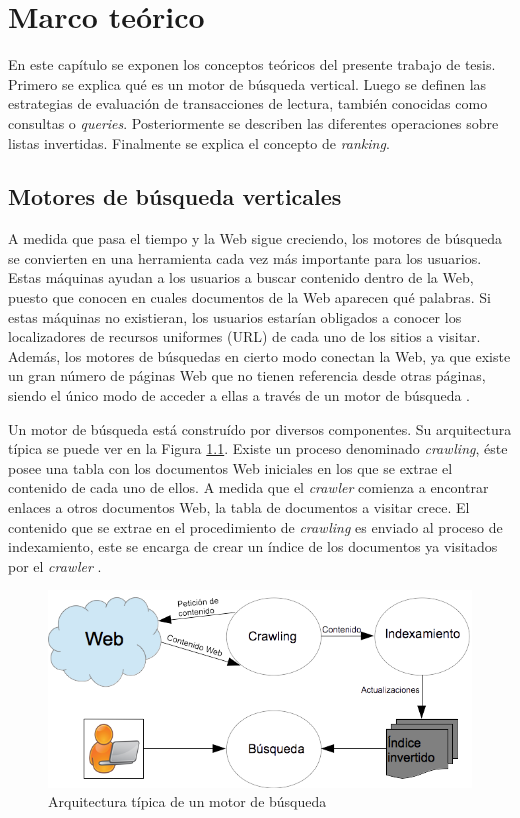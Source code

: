 \chapter{Marco te\'orico}
\label{cap:marco}
En este capítulo se exponen los conceptos teóricos del presente trabajo de tesis. Primero se explica qué es un motor de búsqueda vertical. Luego se definen las estrategias de evaluación de transacciones de lectura, también conocidas como consultas o \textit{queries}. Posteriormente se describen las diferentes operaciones sobre listas invertidas. Finalmente se explica el concepto de \textit{ranking}. 

\section{Motores de búsqueda verticales}
\label{marco:mbv}
A medida que pasa el tiempo y la Web sigue creciendo, los motores de búsqueda se convierten en una herramienta cada vez más importante para los usuarios. Estas máquinas ayudan a los usuarios a buscar contenido dentro de la Web, puesto que conocen en cuales documentos de la Web aparecen qué palabras. Si estas máquinas no existieran, los usuarios estarían obligados a conocer los localizadores de recursos uniformes (URL) de cada uno de los sitios a visitar. Además, los motores de búsquedas en cierto modo conectan la Web, ya que existe un gran número de páginas Web que no tienen referencia desde otras páginas, siendo el único modo de acceder a ellas a través de un motor de búsqueda \citep{Baeza-Yates:2008}.

Un motor de búsqueda está construído por diversos componentes. Su arquitectura típica se puede ver en la Figura \ref{fig:searchenginearchitecture}. Existe un proceso denominado \textit{crawling}, éste posee una tabla con los documentos Web iniciales en los que se extrae el contenido de cada uno de ellos. A medida que el \textit{crawler} comienza a encontrar enlaces a otros documentos Web, la tabla de documentos a visitar crece. El contenido que se extrae en el procedimiento de \textit{crawling} es enviado al proceso de indexamiento, este se encarga de crear un índice de los documentos ya visitados por el \textit{crawler} \citep{Croft:2009}.

\begin{figure}[tp]
\centering
\includegraphics[scale=.75]{images/searchenginearchitecture.png}
\caption{Arquitectura típica de un motor de búsqueda}
\label{fig:searchenginearchitecture}
\end{figure}

